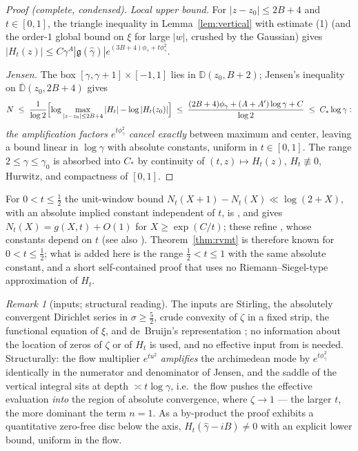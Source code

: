 \documentclass[11pt]{amsart}
\theoremstyle{plain}
\theoremstyle{definition}
\theoremstyle{remark}
\newtheorem{remark}[theorem]{Remark}
\begin{document}
\begin{proof}[Proof \textup{(}complete, condensed\textup{)}]
\emph{Local upper bound.} For $|z-z_0|\le2B+4$ and $t\in[0,1]$, the triangle inequality in Lemma~\ref{lem:vertical} with estimate (1) (and the order-$1$ global bound on $\xi$ for large $|w|$, crushed by the Gaussian) gives $|H_t(z)|\le C\gamma^{A}|\mathfrak g(\hat\gamma)|e^{(3B+4)\phi_\gamma+t\phi_\gamma^2}$.

\emph{Jensen.} The box $[\gamma,\gamma+1]\times[-1,1]$ lies in $\mathbb D(z_0,B+2)$; Jensen's inequality on $\overline{\mathbb D}(z_0,2B+4)$ gives
\[
N\;\le\;\frac1{\log2}\Bigl[\log\max_{|z-z_0|\le2B+4}|H_t|-\log|H_t(z_0)|\Bigr]\;\le\;\frac{(2B+4)\phi_\gamma+(A+A')\log\gamma+C}{\log2}\;\le\;C_\ast\log\gamma:
\]
\emph{the amplification factors $e^{t\phi_\gamma^2}$ cancel exactly} between maximum and center, leaving a bound linear in $\log\gamma$ with absolute constants, uniform in $t\in[0,1]$. The range $2\le\gamma\le\gamma_0$ is absorbed into $C_\ast$ by continuity of $(t,z)\mapsto H_t(z)$, $H_t\not\equiv0$, Hurwitz, and compactness of $[0,1]$.
\end{proof}

For $0<t\le\tfrac12$ the unit-window bound $N_t(X+1)-N_t(X)\ll\log(2+X)$, with an absolute implied constant independent of $t$, is \cite[Thm.~1.5(iv)]{Polymath2019}, and \cite[Thm.~1.5(iii)]{Polymath2019} gives $N_t(X)=g(X,t)+O(1)$ for $X\ge\exp(C/t)$; these refine \cite[Thms.~1.3, 1.4]{KiKimLee2009}, whose constants depend on $t$ (see also \cite{RodgersTao2020}). Theorem~\ref{thm:rvmt} is therefore known for $0<t\le\tfrac12$; what is added here is the range $\tfrac12<t\le1$ with the same absolute constant, and a short self-contained proof that uses no Riemann--Siegel-type approximation of $H_t$.

\begin{remark}[inputs; structural reading]\label{rem:rvmtreading}
The inputs are Stirling, the absolutely convergent Dirichlet series in $\sigma\ge\tfrac52$, crude convexity of $\zeta$ in a fixed strip, the functional equation of $\xi$, and de~Bruijn's representation \cite{deBruijn1950}; no information about the location of zeros of $\zeta$ or of $H_t$ is used, and no effective input from \cite{KiKimLee2009,Polymath2019} is needed. Structurally: the flow multiplier $e^{tu^2}$ \emph{amplifies} the archimedean mode by $e^{t\phi_\gamma^2}$ identically in the numerator and denominator of Jensen, and the saddle of the vertical integral sits at depth $\asymp t\log\gamma$, i.e.\ the flow pushes the effective evaluation \emph{into} the region of absolute convergence, where $\zeta\to1$ --- the larger $t$, the more dominant the term $n=1$. As a by-product the proof exhibits a quantitative zero-free disc below the axis, $H_t(\hat\gamma-iB)\ne0$ with an explicit lower bound, uniform in the flow.
\end{remark}
\end{document}
